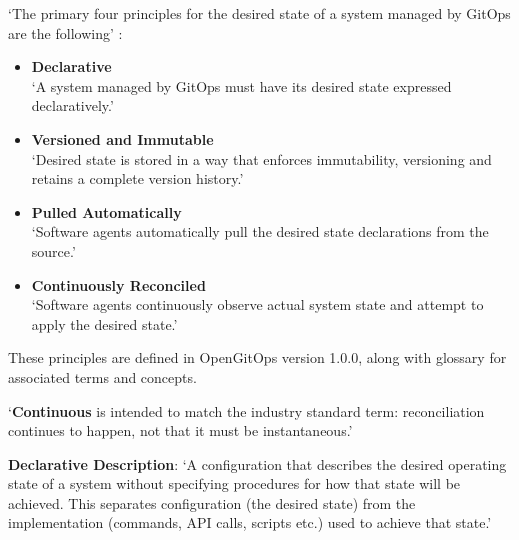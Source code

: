
\noindent
\enquote*{The primary four principles
	for the desired state of a
	system managed by GitOps are the following} \autocite{gitopsPrinciplesv100}:

\begin{itemize}
	\item \textbf{Declarative} \\
	\enquote*{A system managed by GitOps must have its desired state expressed declaratively.}
	\item \textbf{Versioned and Immutable} \\
	\enquote*{Desired state is stored in a way that enforces immutability, versioning and retains a complete version history.}
	\item \textbf{Pulled Automatically} \\
	\enquote*{Software agents automatically pull the desired state declarations from the source.}
	\item \textbf{Continuously Reconciled} \\
	\enquote*{Software agents continuously observe actual system state and attempt to apply the desired state.}
	\autocite{gitopsPrinciplesv100}
\end{itemize}


These principles are defined in OpenGitOps version 1.0.0,
along with glossary
\autocite{gitopsGlossary}
for associated terms and concepts.

\enquote*{\textbf{Continuous} is intended to match the industry standard term: reconciliation continues to happen, not that it must be instantaneous.} \autocite{gitopsGlossary}

\textbf{Declarative Description}:
\enquote*{A configuration that describes the desired operating state of a system without specifying procedures for how that state will be achieved. This separates configuration (the desired state) from the implementation (commands, API calls, scripts etc.) used to achieve that state.}
\autocite{gitopsGlossary}


